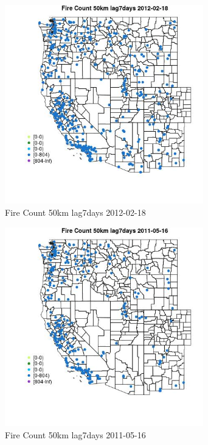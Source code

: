 \begin{figure} 
\centering  
\includegraphics[width=0.77\textwidth]{Code_Outputs/Report_ML_input_PM25_Step4_part_f_de_duplicated_aveswNAs_MapObsFire_Count_50km_lag7days2012-02-18.jpg} 
\caption{\label{fig:Report_ML_input_PM25_Step4_part_f_de_duplicated_aveswNAsMapObsFire_Count_50km_lag7days2012-02-18}Fire Count 50km lag7days 2012-02-18} 
\end{figure} 
 

\begin{figure} 
\centering  
\includegraphics[width=0.77\textwidth]{Code_Outputs/Report_ML_input_PM25_Step4_part_f_de_duplicated_aveswNAs_MapObsFire_Count_50km_lag7days2011-05-16.jpg} 
\caption{\label{fig:Report_ML_input_PM25_Step4_part_f_de_duplicated_aveswNAsMapObsFire_Count_50km_lag7days2011-05-16}Fire Count 50km lag7days 2011-05-16} 
\end{figure} 
 


